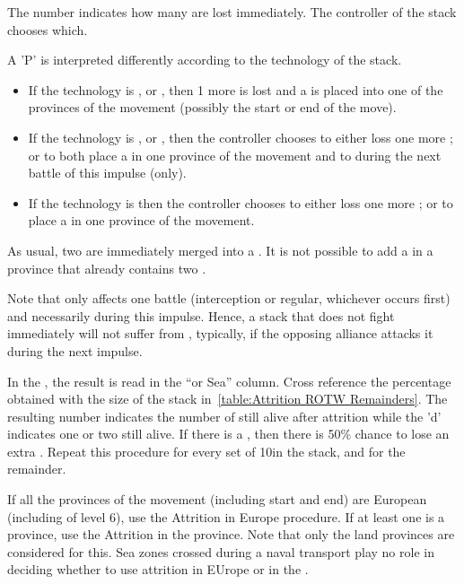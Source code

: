 The number indicates how many \LD are lost immediately. The controller of the
stack chooses which.

A 'P' is interpreted differently according to the technology of the stack.
\begin{itemize}
\item If the technology is \TMED, \TREN or \TARQ, then 1 more \LD is lost and
  a \PILLAGE\facemoins is placed into one of the provinces of the movement
  (possibly the start or end of the move).
\item If the technology is \TMUS, \TBAR or \TMAN, then the controller chooses
  to either loss one more \LD; or to both place a \PILLAGE\facemoins in one
  province of the movement and to  during the next battle of
  this impulse (only).
\item If the technology is \TL then the controller chooses
  to either loss one more \LD; or to place a \PILLAGE\facemoins in one
  province of the movement.
\end{itemize}
As usual, two \PILLAGE\Facemoins are immediately merged into a
\PILLAGE\Faceplus. It is not possible to add a \PILLAGE in a province that
already contains two \PILLAGE\Faceplus.

Note that  only affects one battle (interception or regular,
whichever occurs first) and necessarily during this impulse. Hence, a stack
that does not fight immediately will not suffer from ,
typically, if the opposing alliance attacks it during the next impulse.

\smallskip

In the \ROTW, the result is read in the ``\ROTW or Sea'' column. Cross
reference the percentage obtained with the size of the stack
in~\ref{table:Attrition ROTW Remainders}. The resulting number indicates the
number of \LD still alive after attrition while the 'd' indicates one or two
\LDE still alive. If there is a \textetoile, then there is 50\% chance to lose
an extra \LDE. Repeat this procedure for every set of 10\LD in the stack, and
for the remainder.

If all the provinces of the movement (including start and end) are European
(including \COL of level 6), use the Attrition in Europe procedure. If at
least one is a \ROTW province, use the Attrition in the \ROTW province. Note
that only the land provinces are considered for this. Sea zones crossed during
a naval transport play no role in deciding whether to use attrition in EUrope
or in the \ROTW.

